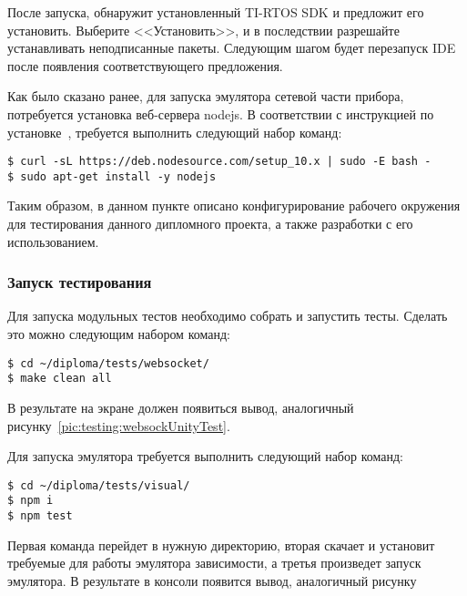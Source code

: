 После запуска,  обнаружит установленный TI-RTOS SDK и предложит его
установить. Выберите <<Установить>>, и в последствии разрешайте устанавливать
неподписанные  пакеты. Следующим шагом будет перезапуск IDE после появления
соответствующего предложения.

Как было сказано ранее, для запуска эмулятора сетевой части прибора, потребуется
установка веб-сервера nodejs. В соответствии с инструкцией по
установке~\cite{nodejs_how_to_install}, требуется выполнить следующий
набор команд:
\begin{lstlisting}
$ curl -sL https://deb.nodesource.com/setup_10.x | sudo -E bash -
$ sudo apt-get install -y nodejs
\end{lstlisting}

Таким образом, в данном пункте описано конфигурирование рабочего окружения для
тестирования данного дипломного проекта, а также разработки с его использованием.

\subsubsection{Запуск тестирования}

Для запуска модульных тестов необходимо собрать и запустить тесты. Сделать это
можно следующим набором команд:
\begin{lstlisting}
$ cd ~/diploma/tests/websocket/
$ make clean all
\end{lstlisting}

В результате на экране должен появиться вывод, аналогичный
рисунку~\ref{pic:testing:websockUnityTest}.

Для запуска эмулятора требуется выполнить следующий набор команд:
\begin{lstlisting}
$ cd ~/diploma/tests/visual/
$ npm i
$ npm test
\end{lstlisting}

Первая команда перейдет в нужную директорию, вторая скачает и установит требуемые
для работы эмулятора зависимости, а третья произведет запуск эмулятора. В результате
в консоли появится вывод, аналогичный рисунку%



